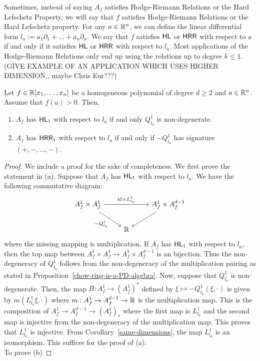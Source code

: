 \documentclass{puthesis-UG}
\begin{document}
Sometimes, instead of saying $A_f$ satisfies Hodge-Riemann Relations or the Hard Lefschetz Property, we will say that $f$ satisfies Hodge-Riemann Relations or the Hard Lefschetz property. For any $a \in \mathbb{R}^n$, we can define the linear differential form $l_a := a_1 \partial_1 + \ldots + a_n \partial_n$. We say that $f$ satisfies $\mathsf{HL}$ or $\mathsf{HRR}$ with respect to $a$ if and only if it satisfies $\mathsf{HL}$ or $\mathsf{HRR}$ with respect to $l_a$. Most applications of the Hodge-Riemann Relations only end up using the relations up to degree $k \leq 1$. (GIVE EXAMPLE OF AN APPLICATION WHICH USES HIGHER DIMENSION,, maybe Chris Eur???) 

\begin{prop} 
	Let $f \in \mathbb{R}[x_1, \ldots, x_n]$ be a homogeneous polynomial of degree $d \geq 2$ and $a \in \mathbb{R}^n$. Assume that $f(a) > 0$. Then, 
	\begin{enumerate}[label = (\alph*)]
		\item $A_f$ has $\mathsf{HL}_1$ with respect to $l_a$ if and only $Q_{l_a}^1$ is non-degenerate. 

		\item $A_f$ has $\mathsf{HRR}_1$ with respect to $l_a$ if and only if $-Q_{l_a}^1$ has signature $(+, -, \ldots, -)$. 
	\end{enumerate}
\end{prop}

\begin{proof}
	We include a proof for the sake of completeness. We first prove the statement in (a). Suppose that $A_f$ has $\mathsf{HL}_1$ with respect to $l_a$. We have the following commutative diagram:
	\[\begin{tikzcd}
	{A_f^1 \times A_f^1} && {A_f^1 \times A_f^{d-1}} \\
	& {\mathbb{R}}
	\arrow["{\text{id} \times L_{l_a}^1}", from=1-1, to=1-3]
	\arrow["{-Q_{l_a}^1}"', from=1-1, to=2-2]
	\arrow[from=1-3, to=2-2]
\end{tikzcd}\]
where the missing mapping is multiplication. If $A_f$ has $\mathsf{HL}_1$ with respect to $l_a$, then the top map between $A_f^1 \times A_f^1 \to A_f^1 \times A_f^{d-1}$ is an bijection. Thus the non-degeneracy of $Q_{l_a}^1$ follows from the non-degeneracy of the multiplication pairing as stated in Proposition~\ref{chow-ring-is-a-PD-algebra}. Now, suppose that $Q_{l_a}^1$ is non-degenerate. Then, the map $B : A_f^1 \to (A_f^1)^*$ defined by $\xi \mapsto -Q_{l_a}^1(\xi, \cdot)$ is given by $m(L_{l_a}^1 \xi, \cdot)$ where $m : A_f^1 \to A_f^{d-1} \to \mathbb{R}$ is the multiplication map. This is the composition of $A_f^1 \to A_f^{d-1} \to (A_f^1)_*$ where the first map is $L_{l_a}^1$ and the second map is injective from the non-degeneracy of the multiplication map. This proves that $L_{l_a}^1$ is injective. From Corollary~\ref{same-dimensions}, the map $L_{l_a}^1$ is an isomorphism. This suffices for the proof of (a). \\

To prove (b)
	
\end{proof}
\end{document}
